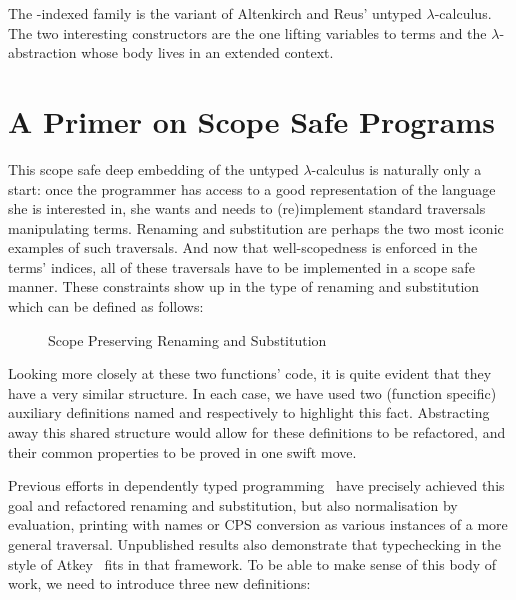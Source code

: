 The -indexed family  is the variant of Altenkirch and Reus' untyped
$\lambda$-calculus. The two interesting constructors are the one lifting variables
to terms and the $\lambda$-abstraction whose body lives in an extended context.

\section{A Primer on Scope Safe Programs}\label{section:primer-program}

This scope safe deep embedding of the untyped $\lambda$-calculus is
naturally only a start: once the programmer has access to a good
representation of the language she is interested in, she wants and
needs to (re)implement standard traversals manipulating terms.
Renaming and substitution are perhaps the two most iconic examples
of such traversals. And now that well-scopedness is enforced in
the terms' indices, all of these traversals have to be implemented
in a scope safe manner. These constraints show up in the type of
renaming and substitution which can be defined as follows:

\begin{figure}[h]
\begin{minipage}{0.45\textwidth}
\end{minipage}\hspace{2em}
\begin{minipage}{0.45\textwidth}
\end{minipage}
\caption{Scope Preserving Renaming and Substitution}
\end{figure}

Looking more closely at these two functions' code, it is quite evident
that they have a very similar structure. In each case, we have used
two (function specific) auxiliary definitions named  and 
respectively to highlight this fact. Abstracting away this shared structure
would allow for these definitions to be refactored, and their common
properties to be proved in one swift move.

Previous efforts in dependently typed
programming~\cite{benton2012strongly,allais2017type}
have precisely achieved this goal and refactored renaming and substitution,
but also normalisation by evaluation, printing with names or CPS conversion
as various instances of a more general traversal. Unpublished results also
demonstrate that typechecking in the style of Atkey~\citeyear{atkey2015algebraic}
fits in that framework. To be able to make sense of this body of work, we
need to introduce three new definitions:

